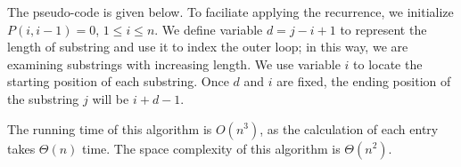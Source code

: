 The pseudo-code is given below. 
To faciliate applying the recurrence, we initialize $P(i, i - 1) = 0$, $1 \le i \le n$.
We define variable $d = j - i + 1$ to represent the length of substring and use it to index the outer loop; in this way,
we are examining substrings with increasing length.
We use variable $i$ to locate the starting position of each substring.
Once $d$ and $i$ are fixed, the ending position of the substring $j$ will be $i + d - 1$.


The running time of this algorithm is $O(n^3)$, as the calculation
of each entry takes $\Theta(n)$ time. The space complexity of this algorithm is $\Theta(n^2)$.

\begin{algorithmblock}[0.8\textwidth]
	\xxx
	\xxx
	\xxx
	\xxx
	\xxx
	\xxx
	\xxx
	\xxx
	\xxx
	\xxx
\end{algorithmblock}




